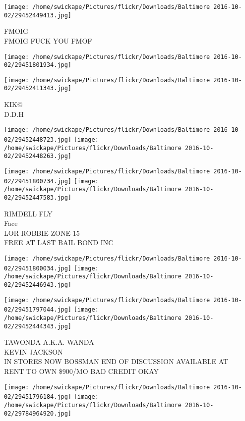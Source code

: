 \documentclass[10pt,letterpaper]{article}
\begin{document}
\vspace{0.25in}
\texttt{[image: /home/swickape/Pictures/flickr/Downloads/Baltimore 2016-10-02/29452449413.jpg]}

FMOIG\\
FMOIG FUCK YOU FMOF
\pagebreak

\texttt{[image: /home/swickape/Pictures/flickr/Downloads/Baltimore 2016-10-02/29451801934.jpg]}

\vspace{0.25in}
\texttt{[image: /home/swickape/Pictures/flickr/Downloads/Baltimore 2016-10-02/29452411343.jpg]}

KIK@\\
D.D.H
\pagebreak

\texttt{[image: /home/swickape/Pictures/flickr/Downloads/Baltimore 2016-10-02/29452448723.jpg]}
\texttt{[image: /home/swickape/Pictures/flickr/Downloads/Baltimore 2016-10-02/29452448263.jpg]}

\texttt{[image: /home/swickape/Pictures/flickr/Downloads/Baltimore 2016-10-02/29451800734.jpg]}
\texttt{[image: /home/swickape/Pictures/flickr/Downloads/Baltimore 2016-10-02/29452447583.jpg]}

RIMDELL FLY\\
Face\\
LOR ROBBIE ZONE 15\\
FREE AT LAST BAIL BOND INC
\pagebreak

\texttt{[image: /home/swickape/Pictures/flickr/Downloads/Baltimore 2016-10-02/29451800034.jpg]}
\texttt{[image: /home/swickape/Pictures/flickr/Downloads/Baltimore 2016-10-02/29452446943.jpg]}

\texttt{[image: /home/swickape/Pictures/flickr/Downloads/Baltimore 2016-10-02/29451797044.jpg]}
\texttt{[image: /home/swickape/Pictures/flickr/Downloads/Baltimore 2016-10-02/29452444343.jpg]}

TAWONDA A.K.A. WANDA\\
KEVIN JACKSON\\
IN STORES NOW BOSSMAN END OF DISCUSSION AVAILABLE AT\\
RENT TO OWN \$900/MO BAD CREDIT OKAY
\pagebreak

\texttt{[image: /home/swickape/Pictures/flickr/Downloads/Baltimore 2016-10-02/29451796184.jpg]}
\texttt{[image: /home/swickape/Pictures/flickr/Downloads/Baltimore 2016-10-02/29784964920.jpg]}
\end{document}
